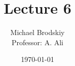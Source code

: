


\title{Lecture 6}
\date{\today}
\author{Michael Brodskiy\\ \small Professor: A. Ali}



\maketitle

